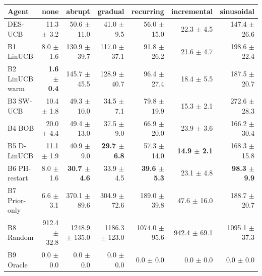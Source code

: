 \begin{tabular}{lrrrrrr}
\toprule
Agent & none & abrupt & gradual & recurring & incremental & sinusoidal \\
\midrule
DES-UCB & 11.3 $\pm$ 3.2 & 50.6 $\pm$ 11.0 & 41.0 $\pm$ 9.5 & 56.0 $\pm$ 15.0 & 22.3 $\pm$ 4.5 & 147.4 $\pm$ 26.6 \\
B1 LinUCB & 8.0 $\pm$ 1.6 & 130.9 $\pm$ 39.7 & 117.0 $\pm$ 37.1 & 91.8 $\pm$ 26.2 & 21.6 $\pm$ 4.7 & 198.6 $\pm$ 22.4 \\
B2 LinUCB warm & \textbf{1.6 $\pm$ 0.4} & 145.7 $\pm$ 45.5 & 128.9 $\pm$ 40.7 & 96.4 $\pm$ 27.4 & 18.4 $\pm$ 5.5 & 187.5 $\pm$ 20.7 \\
B3 SW-UCB & 10.4 $\pm$ 1.8 & 49.3 $\pm$ 10.0 & 34.5 $\pm$ 7.1 & 79.8 $\pm$ 19.9 & 15.3 $\pm$ 2.1 & 272.6 $\pm$ 28.3 \\
B4 BOB & 20.0 $\pm$ 4.4 & 49.4 $\pm$ 13.0 & 37.5 $\pm$ 9.0 & 66.9 $\pm$ 20.0 & 23.9 $\pm$ 3.6 & 166.2 $\pm$ 30.4 \\
B5 D-LinUCB & 11.1 $\pm$ 1.9 & 40.9 $\pm$ 9.0 & \textbf{29.7 $\pm$ 6.8} & 57.3 $\pm$ 14.0 & \textbf{14.9 $\pm$ 2.1} & 168.3 $\pm$ 15.8 \\
B6 PH-restart & 8.0 $\pm$ 1.6 & \textbf{30.7 $\pm$ 4.6} & 33.9 $\pm$ 4.5 & \textbf{39.6 $\pm$ 5.3} & 23.1 $\pm$ 4.8 & \textbf{98.3 $\pm$ 9.9} \\
B7 Prior-only & 6.6 $\pm$ 3.1 & 370.1 $\pm$ 89.6 & 304.9 $\pm$ 72.6 & 189.0 $\pm$ 39.8 & 47.6 $\pm$ 16.0 & 188.7 $\pm$ 20.7 \\
B8 Random & 912.4 $\pm$ 32.8 & 1248.9 $\pm$ 135.0 & 1186.3 $\pm$ 123.0 & 1074.0 $\pm$ 95.6 & 942.4 $\pm$ 69.1 & 1095.1 $\pm$ 37.3 \\
B9 Oracle & 0.0 $\pm$ 0.0 & 0.0 $\pm$ 0.0 & 0.0 $\pm$ 0.0 & 0.0 $\pm$ 0.0 & 0.0 $\pm$ 0.0 & 0.0 $\pm$ 0.0 \\
\bottomrule
\end{tabular}